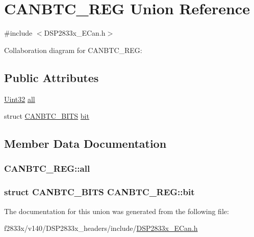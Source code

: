 \hypertarget{union_c_a_n_b_t_c___r_e_g}{}\section{C\+A\+N\+B\+T\+C\+\_\+\+R\+E\+G Union Reference}
\label{union_c_a_n_b_t_c___r_e_g}


{\ttfamily \#include $<$D\+S\+P2833x\+\_\+\+E\+Can.\+h$>$}



Collaboration diagram for C\+A\+N\+B\+T\+C\+\_\+\+R\+E\+G\+:
\subsection*{Public Attributes}
\begin{DoxyCompactItemize}
\item 
\hyperlink{_d_s_p2833x___device_8h_aba99025e657f892beb7ff31cecf64653}{Uint32} \hyperlink{union_c_a_n_b_t_c___r_e_g_a41fdd10944773d0629d872c37cffe10c}{all}
\item 
struct \hyperlink{struct_c_a_n_b_t_c___b_i_t_s}{C\+A\+N\+B\+T\+C\+\_\+\+B\+I\+T\+S} \hyperlink{union_c_a_n_b_t_c___r_e_g_a80a162cf09bfd890e3d36adc4ec56576}{bit}
\end{DoxyCompactItemize}


\subsection{Member Data Documentation}
\hypertarget{union_c_a_n_b_t_c___r_e_g_a41fdd10944773d0629d872c37cffe10c}{}
\subsubsection[{all}]{ C\+A\+N\+B\+T\+C\+\_\+\+R\+E\+G\+::all}\label{union_c_a_n_b_t_c___r_e_g_a41fdd10944773d0629d872c37cffe10c}
\hypertarget{union_c_a_n_b_t_c___r_e_g_a80a162cf09bfd890e3d36adc4ec56576}{}
\subsubsection[{bit}]{\setlength{\rightskip}{0pt plus 5cm}struct {\bf C\+A\+N\+B\+T\+C\+\_\+\+B\+I\+T\+S} C\+A\+N\+B\+T\+C\+\_\+\+R\+E\+G\+::bit}\label{union_c_a_n_b_t_c___r_e_g_a80a162cf09bfd890e3d36adc4ec56576}


The documentation for this union was generated from the following file\+:\begin{DoxyCompactItemize}
\item 
f2833x/v140/\+D\+S\+P2833x\+\_\+headers/include/\hyperlink{_d_s_p2833x___e_can_8h}{D\+S\+P2833x\+\_\+\+E\+Can.\+h}\end{DoxyCompactItemize}
